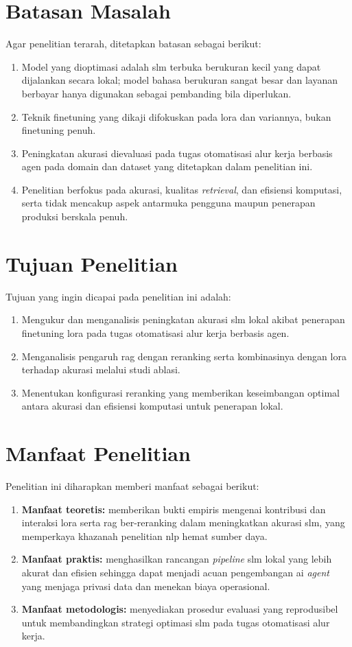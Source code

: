 \section{Batasan Masalah}
Agar penelitian terarah, ditetapkan batasan sebagai berikut:
\begin{enumerate}
    \item Model yang dioptimasi adalah \gls{slm} terbuka berukuran kecil yang dapat dijalankan secara lokal; model bahasa berukuran sangat besar dan layanan berbayar hanya digunakan sebagai pembanding bila diperlukan.
    \item Teknik \gls{finetuning} yang dikaji difokuskan pada \gls{lora} dan variannya, bukan \gls{finetuning} penuh.
    \item Peningkatan akurasi dievaluasi pada tugas otomatisasi alur kerja berbasis agen pada domain dan dataset yang ditetapkan dalam penelitian ini. %
    \item Penelitian berfokus pada akurasi, kualitas \textit{retrieval}, dan efisiensi komputasi, serta tidak mencakup aspek antarmuka pengguna maupun penerapan produksi berskala penuh.
\end{enumerate}

\section{Tujuan Penelitian}
Tujuan yang ingin dicapai pada penelitian ini adalah:
\begin{enumerate}
    \item Mengukur dan menganalisis peningkatan akurasi \gls{slm} lokal akibat penerapan \gls{finetuning} \gls{lora} pada tugas otomatisasi alur kerja berbasis agen.
    \item Menganalisis pengaruh \gls{rag} dengan \gls{reranking} serta kombinasinya dengan \gls{lora} terhadap akurasi melalui studi ablasi.
    \item Menentukan konfigurasi \gls{reranking} yang memberikan keseimbangan optimal antara akurasi dan efisiensi komputasi untuk penerapan lokal.
\end{enumerate}

\section{Manfaat Penelitian}
Penelitian ini diharapkan memberi manfaat sebagai berikut:
\begin{enumerate}
    \item \textbf{Manfaat teoretis:} memberikan bukti empiris mengenai kontribusi dan interaksi \gls{lora} serta \gls{rag} ber-\gls{reranking} dalam meningkatkan akurasi \gls{slm}, yang memperkaya khazanah penelitian \gls{nlp} hemat sumber daya.
    \item \textbf{Manfaat praktis:} menghasilkan rancangan \textit{pipeline} \gls{slm} lokal yang lebih akurat dan efisien sehingga dapat menjadi acuan pengembangan \gls{ai} \textit{agent} yang menjaga privasi data dan menekan biaya operasional.
    \item \textbf{Manfaat metodologis:} menyediakan prosedur evaluasi yang reprodusibel untuk membandingkan strategi optimasi \gls{slm} pada tugas otomatisasi alur kerja.
\end{enumerate}
